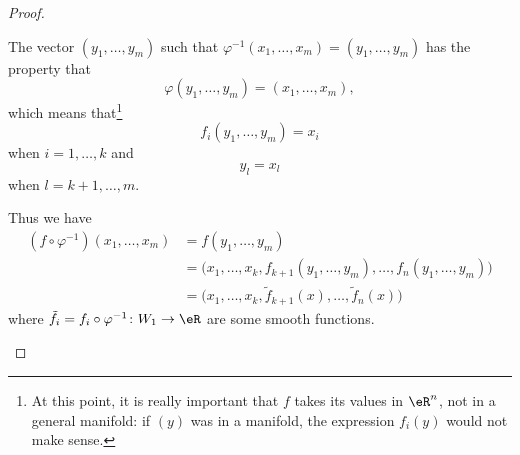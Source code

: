 \begin{proof}
\begin{subproof}
\begin{subproof}
			The vector \( (y_1,\ldots, y_m)\) such that \( \varphi^{-1}(x_1,\ldots, x_m)=(y_1,\ldots, y_m)\) has the property that
			\begin{equation}
				\varphi(y_1,\ldots, y_m)=(x_1,\ldots, x_m),
			\end{equation}
			which means that\footnote{At this point, it is really important that \( f\) takes its values in \( \eR^n\), not in a general manifold: if \( (y)\) was in a manifold, the expression \( f_i(y)\) would not make sense.}
			\begin{equation}
				f_i(y_1,\ldots, y_m)=x_i
			\end{equation}
			when \( i=1,\ldots, k\) and
			\begin{equation}
				y_l=x_l
			\end{equation}
			when \( l=k+1,\ldots, m\).


			Thus we have
			\begin{subequations}
				\begin{align}       \label{EQooAQJGooLqlnXJ}
					(f\circ \varphi^{-1})(x_1,\ldots, x_m) & =f(y_1,\ldots, y_m)                                                                \\
					                                       & =\big( x_1,\ldots, x_k,f_{k+1}(y_1,\ldots, y_m),\ldots, f_n(y_1,\ldots, y_m) \big) \\
					                                       & =\big( x_1,\ldots, x_k,\tilde f_{k+1}(x),\ldots, \tilde f_n(x)\big)
				\end{align}
			\end{subequations}
			where \( \tilde f_i=f_i\circ \varphi^{-1}\colon W_1\to \eR\) are some smooth functions.


\end{subproof}
\end{subproof}
\end{proof}
